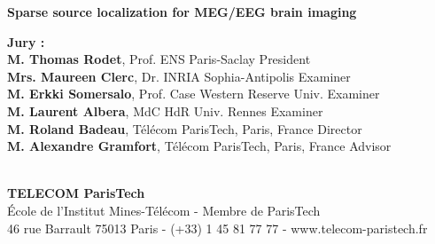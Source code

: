 \documentclass[12pt,a4paper,english]{MastersDoctoralThesis}
\begin{document}
\begin{center}
%
%
%
\vspace{1.cm}%
%
%
%
\begin{spacing}{3.0}
\textcolor[RGB]{191,18,56}{
\noindent
{\Huge{\bf Sparse source localization for MEG/EEG brain imaging}}\\
}
\end{spacing}
%
%
\vspace{2.cm}%
%
%
%
\end{center}
%
%
%
\vspace{-1.2cm}
%
%
%
\flushleft
\hspace{-1.7cm}
\begin{minipage}{1.05\textwidth}	%
{\bf Jury :}\vspace{0.2cm}\\
{\bf M. Thomas Rodet}, {\small Prof. ENS Paris-Saclay}
\hfill President\vspace{0.2cm}\\
{\bf Mrs. Maureen Clerc}, {\small Dr. INRIA Sophia-Antipolis}
\hfill Examiner\\
{\bf M. Erkki Somersalo}, {\small Prof. Case Western Reserve Univ.}
\hfill Examiner\\%
{\bf M. Laurent Albera}, {\small MdC HdR Univ. Rennes}
\hfill Examiner\vspace{0.2cm}\\
{\bf M. Roland Badeau}, {\small T\'el\'ecom ParisTech, Paris, France}
\hfill Director\\
{\bf M. Alexandre Gramfort}, {\small T\'el\'ecom ParisTech, Paris, France}
\hfill Advisor\\
\end{minipage}\\
%
%
%
\vspace{.8cm}
%
%
%
\centering
{\bf TELECOM ParisTech}\\
{\small École de l'Institut Mines-Télécom - Membre de ParisTech}\\
{\tiny 46 rue Barrault 75013 Paris - (+33) 1 45 81 77 77 - www.telecom-paristech.fr}
%
%
%
\newpage
\end{document}
